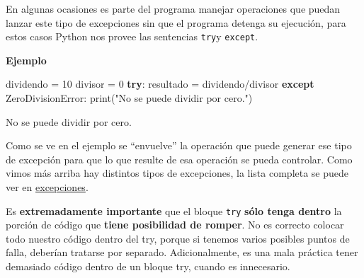 \documentclass[
  letterpaper,
  DIV=11,
  numbers=noendperiod]{scrreprt}
\newenvironment{Shaded}{\begin{snugshade}}{\end{snugshade}}
\newcommand{\BuiltInTok}[1]{\textcolor[rgb]{0.00,0.23,0.31}{#1}}
\newcommand{\ControlFlowTok}[1]{\textcolor[rgb]{0.00,0.23,0.31}{\textbf{#1}}}
\newcommand{\DecValTok}[1]{\textcolor[rgb]{0.68,0.00,0.00}{#1}}
\newcommand{\ExtensionTok}[1]{\textcolor[rgb]{0.00,0.23,0.31}{#1}}
\newcommand{\NormalTok}[1]{\textcolor[rgb]{0.00,0.23,0.31}{#1}}
\newcommand{\OperatorTok}[1]{\textcolor[rgb]{0.37,0.37,0.37}{#1}}
\newcommand{\PreprocessorTok}[1]{\textcolor[rgb]{0.68,0.00,0.00}{#1}}
\newcommand{\StringTok}[1]{\textcolor[rgb]{0.13,0.47,0.30}{#1}}
\begin{document}
En algunas ocasiones es parte del programa manejar operaciones que
puedan lanzar este tipo de excepciones sin que el programa detenga su
ejecución, para estos casos Python nos provee las sentencias
\texttt{try}y \texttt{except}.

\textbf{Ejemplo}

\begin{Shaded}
\begin{Highlighting}[]
\NormalTok{dividendo }\OperatorTok{=} \DecValTok{10}
\NormalTok{divisor }\OperatorTok{=} \DecValTok{0}
\ControlFlowTok{try}\NormalTok{:}
\NormalTok{  resultado }\OperatorTok{=}\NormalTok{ dividendo}\OperatorTok{/}\NormalTok{divisor }
\ControlFlowTok{except} \PreprocessorTok{ZeroDivisionError}\NormalTok{:}
  \BuiltInTok{print}\NormalTok{(}\StringTok{"No se puede dividir por cero."}\NormalTok{)}
\end{Highlighting}
\end{Shaded}

\begin{Shaded}
\begin{Highlighting}[]
\ExtensionTok{No}\NormalTok{ se puede dividir por cero.}
\end{Highlighting}
\end{Shaded}

Como se ve en el ejemplo se ``envuelve'' la operación que puede generar
ese tipo de excepción para que lo que resulte de esa operación se pueda
controlar. Como vimos más arriba hay distintos tipos de excepciones, la
lista completa se puede ver en
\href{https://docs.python.org/es/3/library/exceptions.html\#base-classes}{excepciones}.

\begin{tcolorbox}[enhanced jigsaw, arc=.35mm, toptitle=1mm, colframe=quarto-callout-tip-color-frame, bottomtitle=1mm, opacitybacktitle=0.6, colbacktitle=quarto-callout-tip-color!10!white, leftrule=.75mm, coltitle=black, toprule=.15mm, titlerule=0mm, title=\textcolor{quarto-callout-tip-color}{\faLightbulb}\hspace{0.5em}{Tip}, bottomrule=.15mm, rightrule=.15mm, colback=white, breakable, opacityback=0, left=2mm]

Es \textbf{extremadamente importante} que el bloque \texttt{try}
\textbf{sólo tenga dentro} la porción de código que \textbf{tiene
posibilidad de romper}. No es correcto colocar todo nuestro código
dentro del try, porque si tenemos varios posibles puntos de falla,
deberían tratarse por separado. Adicionalmente, es una mala práctica
tener demasiado código dentro de un bloque try, cuando es innecesario.

\end{tcolorbox}
\end{document}
